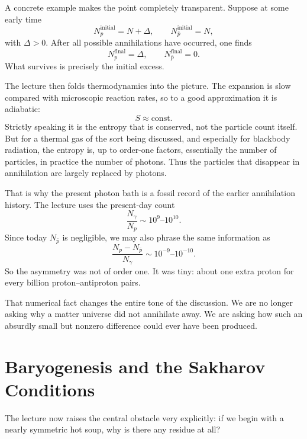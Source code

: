 A concrete example makes the point completely transparent. Suppose at some early time
\begin{equation}
N_p^{\mathrm{initial}}=N+\Delta,
\qquad
N_{\bar p}^{\mathrm{initial}}=N,
\end{equation}
with \(\Delta>0\). After all possible annihilations have occurred, one finds
\begin{equation}
N_p^{\mathrm{final}}=\Delta,
\qquad
N_{\bar p}^{\mathrm{final}}=0.
\end{equation}
What survives is precisely the initial excess.

The lecture then folds thermodynamics into the picture. The expansion is slow compared with microscopic reaction rates, so to a good approximation it is adiabatic:
\begin{equation}
S \approx \text{const.}
\end{equation}
Strictly speaking it is the entropy that is conserved, not the particle count itself. But for a thermal gas of the sort being discussed, and especially for blackbody radiation, the entropy is, up to order-one factors, essentially the number of particles, in practice the number of photons. Thus the particles that disappear in annihilation are largely replaced by photons.

That is why the present photon bath is a fossil record of the earlier annihilation history. The lecture uses the present-day count
\begin{equation}
\frac{N_\gamma}{N_p}\sim 10^9\text{--}10^{10}.
\end{equation}
Since today \(N_{\bar p}\) is negligible, we may also phrase the same information as
\begin{equation}
\frac{N_p-N_{\bar p}}{N_\gamma}\sim 10^{-9}\text{--}10^{-10}.
\end{equation}
So the asymmetry was not of order one. It was tiny: about one extra proton for every billion proton--antiproton pairs.

That numerical fact changes the entire tone of the discussion. We are no longer asking why a matter universe did not annihilate away. We are asking how such an absurdly small but nonzero difference could ever have been produced.

\section{Baryogenesis and the Sakharov Conditions}

The lecture now raises the central obstacle very explicitly: if we begin with a nearly symmetric hot soup, why is there any residue at all?

